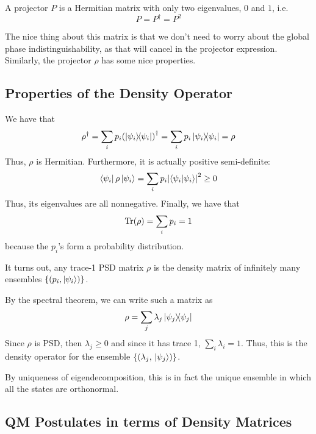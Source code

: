 \begin{definition}[Projector]
    A projector $P$ is a Hermitian matrix with only two eigenvalues, $0$ and $1$, i.e.
    \[ P = P^{\dagger} = P^2 \]
\end{definition}

The nice thing
about this matrix is that we don't need to worry about the global phase indistinguishability, as that will cancel in the
projector expression. Similarly, the projector $\rho$ has some nice properties.

\subsection{Properties of the Density Operator}

We have that
\[ \rho^{\dagger} = \sum_i p_i \qty(\ketbra{\psi_i}{\psi_i})^{\dagger} = \sum_i p_i \ketbra{\psi_i}{\psi_i} = \rho \]
Thus, $\rho$ is Hermitian. Furthermore, it is actually positive semi-definite:
\[ \bra{\psi_i} \rho \ket{\psi_i} = \sum_i p_i \qty|\braket{\psi_i}{\psi_i}|^2 \geq 0 \]
Thus, its eigenvalues are all nonnegative. Finally, we have that
\[ \Tr(\rho) = \sum_i p_i = 1 \]
because the $p_i$'s form a probability distribution.

\begin{theorem}
It turns out, any trace-1 PSD matrix $\rho$ is the density matrix of infinitely many
ensembles $\{(p_i, \ket{\psi_i})\}$.

\begin{proof*}
By the spectral theorem, we can write
such a matrix as
\[ \rho = \sum_j \lambda_j \ketbra{\psi_j}{\psi_j} \]
Since $\rho$ is PSD, then $\lambda_j \geq 0$ and since it has trace 1, $\sum_{i} \lambda_i = 1$.
Thus, this is the density operator for the ensemble $\{(\lambda_j, \ket*{\psi_j})\}$.

By uniqueness of eigendecomposition, this is in fact the unique ensemble in which all the states
are orthonormal.
\end{proof*}
\end{theorem}

\subsection{QM Postulates in terms of Density Matrices}

